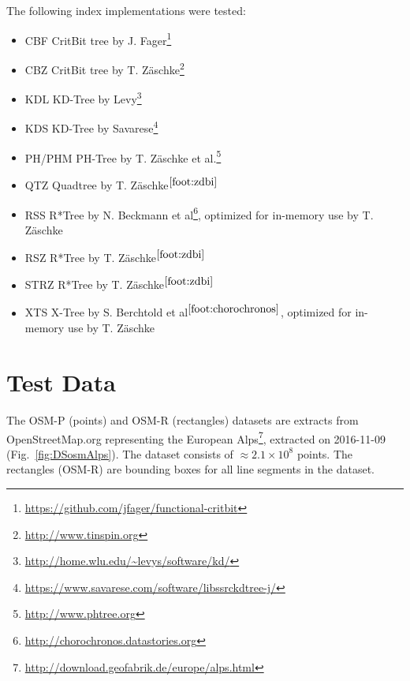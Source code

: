 \documentclass{vldb}
\begin{document}
The following index implementations were tested:

\begin{itemize}
	\item CBF CritBit tree by J. Fager\footnote{\url{https://github.com/jfager/functional-critbit}}
	\item CBZ CritBit tree by T. Z\"{a}schke\footnote{\url{http://www.tinspin.org}\label{foot:zdbi}}
	\item KDL KD-Tree by Levy\footnote{\url{http://home.wlu.edu/~levys/software/kd/}}
	\item KDS KD-Tree by Savarese\footnote{\url{https://www.savarese.com/software/libssrckdtree-j/}}
	\item PH/PHM PH-Tree by T. Z\"{a}schke et al.\footnote{\url{http://www.phtree.org}}
	\item QTZ Quadtree by T. Z\"{a}schke$^{\ref{foot:zdbi}}$
	\item RSS R*Tree by N. Beckmann et al\footnote{\url{http://chorochronos.datastories.org}\label{foot:chorochronos}}, optimized for in-memory use by T. Z\"{a}schke
	\item RSZ R*Tree by T. Z\"{a}schke$^{\ref{foot:zdbi}}$
	\item STRZ R*Tree by T. Z\"{a}schke$^{\ref{foot:zdbi}}$
	\item XTS X-Tree by S. Berchtold et al$^{\ref{foot:chorochronos}}$, optimized for in-memory use by T. Z\"{a}schke
\end{itemize}


\section{Test Data}
\label{sec:data}


The OSM-P (points) and OSM-R (rectangles) datasets are extracts from OpenStreetMap.org representing the European Alps\footnote{\url{http://download.geofabrik.de/europe/alps.html}}, extracted on 2016-11-09 %
(Fig.~\ref{fig:DSosmAlps}). The dataset consists of $\approx 2.1 \times 10^8$ points.
The rectangles (OSM-R) are bounding boxes for all line segments in the dataset.
\end{document}
